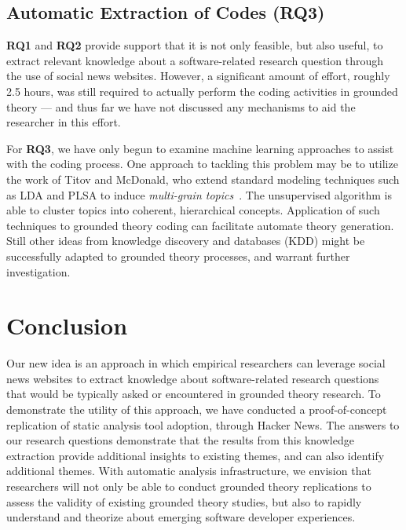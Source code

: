 \documentclass{sig-alternate}
\begin{document}


\subsection{Automatic Extraction of Codes (RQ3)}

\textbf{RQ1} and \textbf{RQ2} provide support that it is not only feasible, but also useful, to extract relevant knowledge about a software-related research question through the use of social news websites. However, a significant amount of effort, roughly 2.5 hours, was still required to actually perform the coding activities in grounded theory --- and thus far we have not discussed any mechanisms to aid the researcher in this effort.

For \textbf{RQ3}, we have only begun to examine machine learning approaches to assist with the coding process. One approach to tackling this problem may be to utilize the work of Titov and McDonald, who extend standard modeling techniques such as LDA and PLSA to induce \textit{multi-grain topics}~\cite{Titov2008}. The unsupervised algorithm is able to cluster topics into coherent, hierarchical concepts. Application of such techniques to grounded theory coding can facilitate automate theory generation. Still other ideas from knowledge discovery and databases (KDD) might be successfully adapted to grounded theory processes, and warrant further investigation.

\balance

\section{Conclusion}

Our new idea is an approach in which empirical researchers can leverage social news websites to extract knowledge about software-related research questions that would be typically asked or encountered in grounded theory research. To demonstrate the utility of this approach, we have conducted a proof-of-concept replication of static analysis tool adoption, through Hacker News. The answers to our research questions demonstrate that the results from this knowledge extraction provide additional insights to existing themes, and can also identify additional themes. With automatic analysis infrastructure, we envision that researchers will not only be able to conduct grounded theory replications to assess the validity of existing grounded theory studies, but also to rapidly understand and theorize about  emerging software developer experiences.
\end{document}
